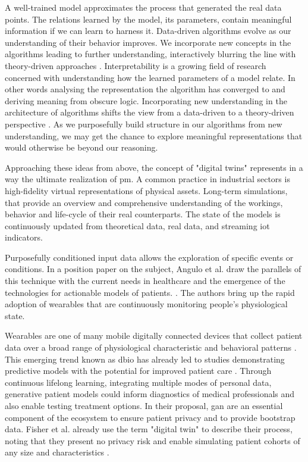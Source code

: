             A well-trained model approximates the process that generated the real data points. The relations learned by the model, its parameters, contain meaningful information if we can learn to harness it. Data-driven algorithms evolve as our understanding of their behavior improves. We incorporate new concepts in the algorithms leading to further understanding, interactively blurring the line with theory-driven approaches \cite{Hand2019}. Interpretability is a growing field of research concerned with understanding how the learned parameters of a model relate. In other words analysing the representation the algorithm has converged to and deriving meaning from obscure logic. Incorporating new understanding in the architecture of algorithms shifts the view from a data-driven to a theory-driven perspective \cite{Hand2019}. As we purposefully build structure in our algorithms from new understanding, we may get the chance to explore meaningful representations that would otherwise be beyond our reasoning.\par 
            
            Approaching these ideas from above, the concept of "digital twins" represents in a way the ultimate realization of \gls{pm}. A common practice in industrial sectors is high-fidelity virtual representations of physical assets. Long-term simulations, that provide an overview and comprehensive understanding of the workings, behavior and life-cycle of their real counterparts. The state of the models is continuously updated from theoretical data, real data, and streaming \gls{iot} indicators.\par
            Purposefully conditioned input data allows the exploration of specific events or conditions. In a position paper on the subject, Angulo et al. draw the parallels of this technique with the current needs in healthcare and the emergence of the technologies for actionable models of patients. \cite{angulo2019towards,Angulo_2020}. The authors bring up the rapid adoption of wearables that are continuously monitoring people's physiological state.\par 
            
            Wearables are one of many mobile digitally connected devices that collect patient data over a broad range of physiological characteristic and behavioral patterns \cite{coravos2019developing}. This emerging trend known as \gls{dbio} has already led to studies demonstrating predictive models with the potential for improved patient care \cite{snyder2018best}. Through continuous lifelong learning, integrating  multiple modes of personal data, generative patient models could inform diagnostics of medical professionals and also enable testing treatment options. In their proposal, \gls{gan} are an essential component of the ecosystem to ensure patient privacy and to provide bootstrap data. Fisher et al. already use the term "digital twin" to describe their process, noting that they present no privacy risk and enable simulating patient cohorts of any size and characteristics \cite{walsh2020generating}.
        

